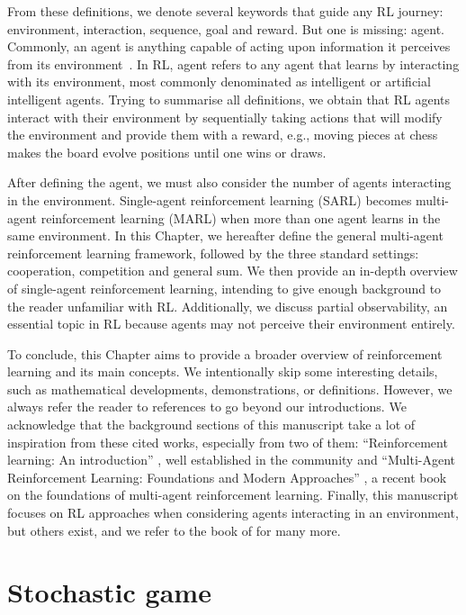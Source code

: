 From these definitions, we denote several keywords that guide any RL journey: environment, interaction, sequence, goal and reward.
But one is missing: agent.
Commonly, an agent is anything capable of acting upon information it perceives from its environment~\citep{russel2010}.
In RL, agent refers to any agent that learns by interacting with its environment, most commonly denominated as intelligent or artificial intelligent agents.
Trying to summarise all definitions, we obtain that RL agents interact with their environment by sequentially taking actions that will modify the environment and provide them with a reward, e.g., moving pieces at chess makes the board evolve positions until one wins or draws.

After defining the agent, we must also consider the number of agents interacting in the environment.
Single-agent reinforcement learning (SARL) becomes multi-agent reinforcement learning (MARL) when more than one agent learns in the same environment.
In this Chapter, we hereafter define the general multi-agent reinforcement learning framework, followed by the three standard settings: cooperation, competition and general sum.
We then provide an in-depth overview of single-agent reinforcement learning, intending to give enough background to the reader unfamiliar with RL.
Additionally, we discuss partial observability, an essential topic in RL because agents may not perceive their environment entirely.

To conclude, this Chapter aims to provide a broader overview of reinforcement learning and its main concepts.
We intentionally skip some interesting details, such as mathematical developments, demonstrations, or definitions.
However, we always refer the reader to references to go beyond our introductions.
We acknowledge that the background sections of this manuscript take a lot of inspiration from these cited works, especially from two of them: ``Reinforcement learning: An introduction'' \citep{sutton2018reinforcement}, well established in the community and ``Multi-Agent Reinforcement Learning: Foundations and Modern Approaches'' \citep{marl-book}, a recent book on the foundations of multi-agent reinforcement learning.
Finally, this manuscript focuses on RL approaches when considering agents interacting in an environment, but others exist, and we refer to the book of \cite{russel2010} for many more.

\section{Stochastic game}
\label{sec:ch2_stochastic_Game}

